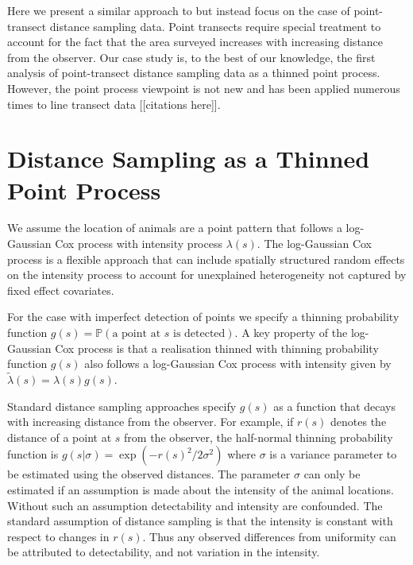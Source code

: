 \documentclass[preprint,12pt]{elsarticle}
\newcommand{\tl}{\tilde{\lambda}}   %
\begin{document}
Here we present a similar approach to \citet{yuan_point_2017} but instead focus on the case of point-transect distance sampling data.  Point transects require special treatment to account for the fact that the area surveyed increases with increasing distance from the observer.  Our case study is, to the best of our knowledge, the first analysis of point-transect distance sampling data as a thinned point process.  However, the point process viewpoint is not new and has been applied numerous times to line transect data [[citations here]].

\section*{Distance Sampling as a Thinned Point Process}

We assume the location of animals are a point pattern that follows a log-Gaussian Cox process with intensity process $\lambda(s)$.  The log-Gaussian Cox process is a flexible approach that can include spatially structured random effects on the intensity process to account for unexplained heterogeneity not captured by fixed effect covariates.

\sloppy For the case with imperfect detection of points we specify a thinning probability function $g(s) = \mathbb{P}(\text{a point at $s$ is detected})$. A key property of the log-Gaussian Cox process is that a realisation thinned with thinning probability function $g(s)$ also follows a log-Gaussian Cox process with intensity given by $\tl(s) = \lambda(s)g(s)$.

Standard distance sampling approaches specify $g(s)$ as a function that decays with increasing distance from the observer.  For example, if $r(s)$ denotes the distance of a point at $s$ from the observer, the half-normal thinning probability function is $g(s | \sigma) = \exp(-r(s)^2 / 2\sigma^2)$ where $\sigma$ is a variance parameter to be estimated using the observed distances.  The parameter $\sigma$ can only be estimated if an assumption is made about the intensity of the animal locations.  Without such an assumption detectability and intensity are confounded.  The standard assumption of distance sampling is that the intensity is constant with respect to changes in $r(s)$.  Thus any observed differences from uniformity can be attributed to detectability, and not variation in the intensity.
\end{document}
